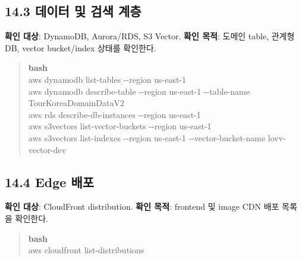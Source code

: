 \documentclass[12pt,a4paper]{article}
\newcommand{\DocNeedspace}[1]{\par\ifdim\dimexpr\pagegoal-\pagetotal\relax<#1\newpage\fi}
\begin{document}
\DocNeedspace{15\baselineskip}
\subsection*{14.3 데이터 및 검색 계층}
\textbf{확인 대상}: DynamoDB, Aurora/RDS, S3 Vector.\newline
\textbf{확인 목적}: 도메인 table, 관계형 DB, vector bucket/index 상태를 확인한다.

\begin{quote}
\begin{scriptsize}
\ttfamily
\RaggedRight
\setlength{\parskip}{1pt}
\textcolor{LovvGreen}{\textbf{bash}}\\[0.2em]
aws dynamodb list-\allowbreak{}tables -\allowbreak{}-\allowbreak{}region us-\allowbreak{}east-\allowbreak{}1\\
aws dynamodb describe-\allowbreak{}table -\allowbreak{}-\allowbreak{}region us-\allowbreak{}east-\allowbreak{}1 -\allowbreak{}-\allowbreak{}table-\allowbreak{}name Tour\allowbreak{}Korea\allowbreak{}Domain\allowbreak{}Data\allowbreak{}V2\\
aws rds describe-\allowbreak{}db-\allowbreak{}instances -\allowbreak{}-\allowbreak{}region us-\allowbreak{}east-\allowbreak{}1\\
aws s3vectors list-\allowbreak{}vector-\allowbreak{}buckets -\allowbreak{}-\allowbreak{}region us-\allowbreak{}east-\allowbreak{}1\\
aws s3vectors list-\allowbreak{}indexes -\allowbreak{}-\allowbreak{}region us-\allowbreak{}east-\allowbreak{}1 -\allowbreak{}-\allowbreak{}vector-\allowbreak{}bucket-\allowbreak{}name lovv-\allowbreak{}vector-\allowbreak{}dev\\
\end{scriptsize}
\end{quote}


\DocNeedspace{10\baselineskip}
\subsection*{14.4 Edge 배포}
\textbf{확인 대상}: CloudFront distribution.\newline
\textbf{확인 목적}: frontend 및 image CDN 배포 목록을 확인한다.

\begin{quote}
\begin{scriptsize}
\ttfamily
\RaggedRight
\setlength{\parskip}{1pt}
\textcolor{LovvGreen}{\textbf{bash}}\\[0.2em]
aws cloudfront list-\allowbreak{}distributions\\
\end{scriptsize}
\end{quote}
\end{document}
